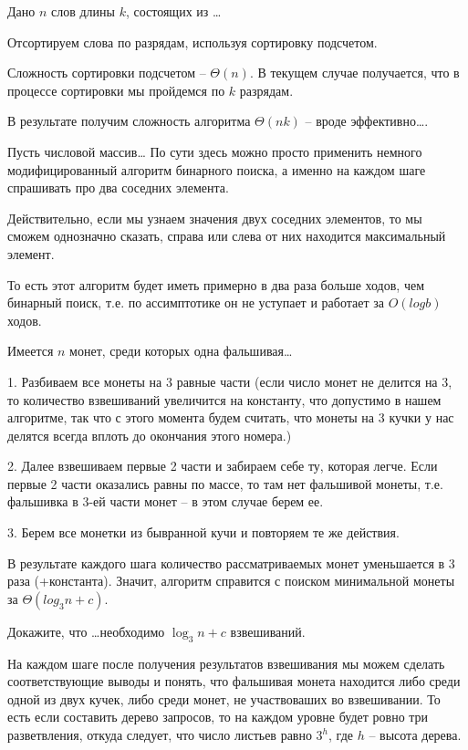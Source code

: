 \documentclass[12pt]{extreport}
\theoremstyle{definiton}
\theoremstyle{definition}
\theoremstyle{definition}
\newcounter{problem}
\newcounter{subproblem}
\def\beforPRskip{
	\bigskip
}
\def\pr{\beforPRskip\noindent\stepcounter{problem}{\bf \theproblem .\;}\setcounter{subproblem}{0}}
\begin{document}
	

\pr Дано $n$ слов длины $k$, состоящих из \ldots

	Отсортируем слова по разрядам, используя сортировку подсчетом.

	Сложность сортировки подсчетом -- $\Theta(n)$. В текущем случае получается, что в процессе сортировки мы пройдемся по $k$ разрядам.

	В результате получим сложность алгоритма $\Theta(nk)$ -- вроде эффективно\ldots.

\pr Пусть числовой массив\ldots
	По сути здесь можно просто применить немного модифицированный алгоритм бинарного поиска, а именно на каждом шаге спрашивать про два соседних элемента.

	Действительно, если мы узнаем значения двух соседних элементов, то мы сможем однозначно сказать, справа или слева от них находится максимальный элемент.

	То есть этот алгоритм будет иметь примерно в два раза больше ходов, чем бинарный поиск, т.е. по ассимптотике он не уступает и работает за $O(logb)$ ходов.

\pr Имеется $n$ монет, среди которых одна фальшивая\ldots

	1. Разбиваем все монеты на 3 равные части (если число монет не делится на 3, то количество взвешиваний увеличится на константу, что допустимо в нашем алгоритме, так что с этого момента будем считать, что монеты на 3 кучки у нас делятся всегда вплоть до окончания этого номера.)

	2. Далее взвешиваем первые 2 части и забираем себе ту, которая легче. Если первые 2 части оказались равны по массе, то там нет фальшивой монеты, т.е. фальшивка в 3-ей части монет -- в этом случае берем ее.

	3. Берем все монетки из бывранной кучи и повторяем те же действия.

	В результате каждого шага количество рассматриваемых монет уменьшается в 3 раза (+константа). Значит, алгоритм справится с поиском минимальной монеты за $\Theta (log_3n + c)$.

\pr Докажите, что \ldots необходимо $\log_3 n + c$ взвешиваний.

	На каждом шаге после получения результатов взвешивания мы можем сделать соответствующие выводы и понять, что фальшивая монета находится либо среди одной из двух кучек, либо среди монет, не участвоваших во взвешивании.
	То есть если составить дерево запросов, то на каждом уровне будет ровно три разветвления, откуда следует, что число листьев равно $3^h$, где $h$ -- высота дерева.
\end{document}
